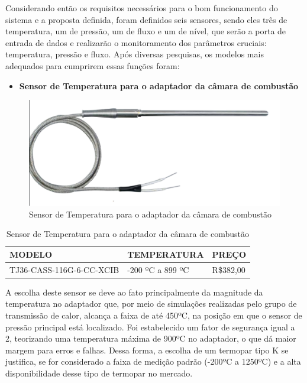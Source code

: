 Considerando então os requisitos necessários para o bom funcionamento do sistema e a proposta definida, foram definidos seis sensores, sendo eles três de temperatura, um de pressão, um de fluxo e um de nível, que serão a porta de entrada de dados e realizarão o monitoramento dos parâmetros cruciais: temperatura, pressão e fluxo. Após diversas pesquisas, os modelos mais adequados para cumprirem essas funções foram:
\newpage
\begin{itemize}
    \item \textbf{Sensor de Temperatura para o adaptador da câmara de combustão}
\end{itemize}
\begin{figure}[!htb]                  
	\centering                          
	\includegraphics[scale=0.5]{figuras/Sensor1.eps}
	\caption{ Sensor de Temperatura para o adaptador da câmara de combustão }             
\end{figure}

\begin{table}[!h]
    \centering
    \begin{tabular}{|p{5cm}|p{5cm}|p{5cm}|}
    \hline
    \textbf{MODELO} & \textbf{TEMPERATURA}    & \textbf{PREÇO}  \\ \hline
    TJ36-CASS-116G-6-CC-XCIB      & -200 ºC a 899 ºC &  R\$382,00  \\ \hline
    \end{tabular}
    \caption{Sensor de Temperatura para o adaptador da câmara de combustão}
    \end{table}

A escolha deste sensor se deve ao fato principalmente da magnitude da temperatura no adaptador que, por meio de simulações realizadas pelo grupo de transmissão de calor, alcança a faixa de até 450ºC, na posição em que o sensor de pressão principal está localizado. Foi estabelecido um fator de segurança igual a 2, teorizando uma temperatura máxima de 900ºC no adaptador, o que dá maior margem para erros e falhas. Dessa forma, a escolha de um termopar tipo K se justifica, se for considerado a faixa de medição padrão (-200ºC a 1250ºC) e a alta disponibilidade desse tipo de termopar no mercado.


